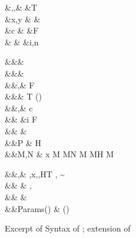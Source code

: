 \documentclass[screen,nonacm,manuscript,review]{acmart} %
\begin{document}
 \begin{figure}[ht]
 \begin{syntax}
  &\TyVar,\beta,\Co &\qquad{} &T \\
  &x,y &\qquad{} &\shl{\NType} \\
  &c &\qquad{} &F\\
                      &  &\qquad{} &i,n \in {}\\
 \end{syntax}
 \begin{syntax}
    &&\rho \bnfeq& \\
    &&\kappa \bnfeq& \star \bnfor \kappa \to \kappa \bnfor \shl{\sigma \sim^\kappa_\rho \tau}\\
    &&\tau,\sigma \bnfeq& \TyVar \bnfor {} \bnfor
   \tau\App\tau \bnfor \Forall {\TyVar\co\kappa} \tau \bnfor
   F\many\tau \bnfor \Co \\
     &&\TypeConst \bnfeq& T \bnfor (\to) \bnfor \shl{\NType}\\
  &&\nu,\Co \bnfeq& c \bnfor \Refl\tau \bnfor \Sym\Co \bnfor \Trans\nu\Co %
 \bnfor \Forall {\TyVar\co\kappa} \Co \bnfor \Co\At\tau %
 \bnfor \nu\App\Co \\
                  &&              &\bnfor \Left \Co \bnfor \Right \Co \bnfor \Nth i \Co \bnfor \TypeConst\App\many\Co \bnfor F\many\Co \bnfor \shl{\SubCo \Co} \\  %
  && \phi \bnfeq& \tau \bnfor \Co\\
  &&P \bnfeq& H\App \many{\TyVar\co\kappa} \\
  &&M,N \bnfeq& x \bnfor {} M \bnfor M\App N \bnfor \TLam{\tau\co\kappa} M \bnfor M\App \tau \bnfor H \bnfor \Case M  \bnfor \Cast \Tm \Co
 \end{syntax}
 \begin{syntax}
  &&\TEnv,\Delta \bnfeq& \empt \bnfor \TEnv,x\co\tau \bnfor \TEnv,\TyVar\co\kappa \bnfor \TEnv,H\co T \bnfor \TEnv, \Co \co \tau\sim\sigma\\
  && \bnfeq& \empt \bnfor {},\alpha\co\rho\\
                     &&\roles{\TypeConst} \bnfeq& {}\\
                     &&Params(\TypeConst) \bnfeq& \many{\alpha\co\rho}\quad  {} (\TypeConst\App\many\alpha) \co \star%
 \end{syntax}
 \caption{Excerpt of Syntax of \SFR; extension of \SFC}
 \label{fig:sfr-syntax}
 \end{figure}
\end{document}
